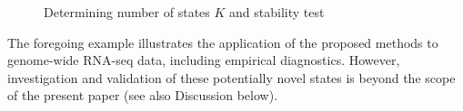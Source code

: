 \begin{figure}
  \centering
    \caption{Determining number of states $K$ and stability test}
  \label{fig:data-m-k}
\end{figure}

The foregoing example illustrates the application  of the proposed methods to genome-wide RNA-seq data, including empirical diagnostics. However, investigation and validation of these potentially novel states is beyond the scope of the present paper (see also Discussion below).

